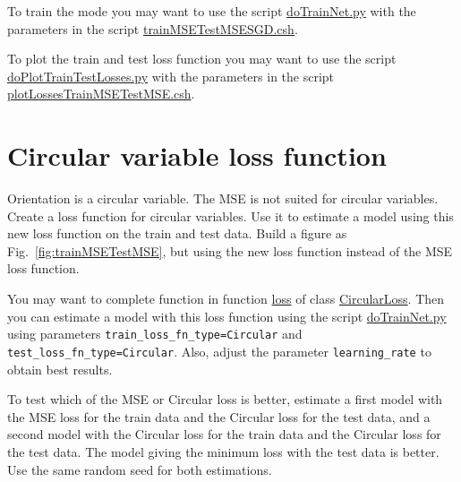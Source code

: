 \documentclass[12pt]{article}
\begin{document}
To train the mode you may want to use the script
\href{https://github.com/joacorapela/statNeuro2025/blob/master/worksheets/08_artificialNeuralNetworks/code/scripts/doTrainNet.py}{doTrainNet.py}
with the parameters in the script
\href{https://github.com/joacorapela/statNeuro2025/blob/master/worksheets/08_artificialNeuralNetworks/code/scripts/trainMSETestMSESGD.csh}{trainMSETestMSESGD.csh}.

To plot the train and test loss function you may want to use the script
\href{https://github.com/joacorapela/statNeuro2025/blob/master/worksheets/08_artificialNeuralNetworks/code/scripts/doPlotTrainTestLosses.py}{doPlotTrainTestLosses.py}
with the parameters in the script
\href{https://github.com/joacorapela/statNeuro2025/blob/master/worksheets/08_artificialNeuralNetworks/code/scripts/plotLossesTrainMSETestMSE.csh}{plotLossesTrainMSETestMSE.csh}.

\section{Circular variable loss function}

Orientation is a circular variable. The MSE is not suited for circular
variables. Create a loss function for circular variables. Use it to estimate a
model using this new loss function on the train and test data. Build a figure
as Fig.~\ref{fig:trainMSETestMSE}, but using the new loss function instead of
the MSE loss function.

You may want to complete function in function
\href{https://github.com/joacorapela/statNeuro2025/blob/90b240fe0c8dc1f0bb0a48a0c5cc7e56754001a2/worksheets/08_artificialNeuralNetworks/code/scripts/myNets.py#L71}{loss}
of class
\href{https://github.com/joacorapela/statNeuro2025/blob/90b240fe0c8dc1f0bb0a48a0c5cc7e56754001a2/worksheets/08_artificialNeuralNetworks/code/scripts/myNets.py#L66}{CircularLoss}.
%
Then you can estimate a model with this loss function using the script
\href{https://github.com/joacorapela/statNeuro2025/blob/master/worksheets/08_artificialNeuralNetworks/code/scripts/doTrainNet.py}{doTrainNet.py}
using parameters \texttt{train\_loss\_fn\_type=Circular} and
\texttt{test\_loss\_fn\_type=Circular}. Also, adjust the parameter
\texttt{learning\_rate} to obtain best results.

To test which of the MSE or Circular loss is better, estimate a first model with
the MSE loss for the train data and the Circular loss for the test data,
and a second model with the Circular loss for the train data and the Circular
loss for the test data. The model giving the minimum loss with the test data is
better. Use the same random seed for both estimations.
\end{document}
